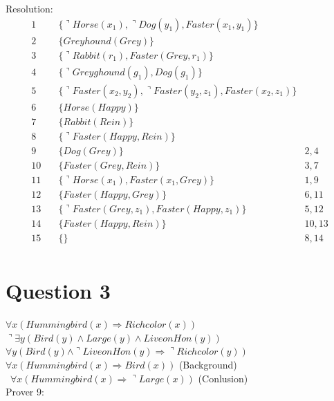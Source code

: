 \documentclass[letterpaper, 12pt]{artikel3}
\begin{document}
Resolution: 
\begin{align*}
1 \quad & \{ \urcorner Horse(x_1), \urcorner Dog(y_1), Faster(x_1,y_1) \}\\
2 \quad & \{Greyhound(Grey)\}\\
3 \quad & \{\urcorner Rabbit(r_1),Faster(Grey,r_1)\} \\
4 \quad & \{ \urcorner Greyghound(g_1), Dog(g_1) \} \\
5 \quad & \{ \urcorner Faster(x_2,y_2), \urcorner Faster(y_2,z_1), Faster(x_2,z_1) \} \\
6 \quad &  \{Horse(Happy)\} \\
7 \quad & \{Rabbit(Rein)\}\\
8 \quad & \{\urcorner Faster(Happy,Rein)\}\\
9 \quad & \{Dog(Grey) \} & 2,4\\ 
10 \quad & \{Faster(Grey, Rein)\} & 3,7\\
11 \quad & \{\urcorner Horse(x_1), Faster(x_1,Grey)\} & 1,9\\
12 \quad & \{Faster(Happy,Grey)\} & 6,11\\
13 \quad & \{\urcorner Faster(Grey,z_1), Faster(Happy,z_1) \} & 5,12\\
14 \quad & \{ Faster(Happy,Rein) \} & 10,13\\
15 \quad & \{ \} & 8,14\\
\end{align*}
\section*{Question 3}
$\forall x (Hummingbird(x) \Rightarrow Richcolor(x) )$ \\ 
$\urcorner \exists y ( Bird(y) \land Large(y) \land LiveonHon(y))$\\
$\forall y (Bird(y) \land \urcorner LiveonHon(y) \Rightarrow \urcorner Richcolor(y))$\\
$\forall x (Hummingbird(x) \Rightarrow Bird(x) )$  (Background)\\\
$\forall x (Hummingbird(x) \Rightarrow \urcorner Large(x))$  (Conlusion)\\

Prover 9:\\
\end{document}
